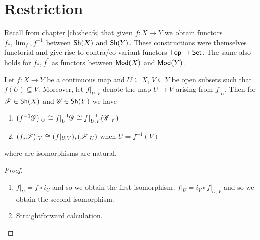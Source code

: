 \documentclass{memoir}
\begin{document}
\section{Restriction}
\begin{remark}
    Recall from chapter \ref{ch:sheafs} that given $f:X\to Y$ we obtain functors $f_*,\lim_f,f^{-1}$ between ${\normalfont\mathsf{Sh}}(X)$ and ${\normalfont\mathsf{Sh}}(Y)$.
    These constructions were themselves functorial and give rise to contra/co-variant functors ${\normalfont\mathsf{Top}}\to {\normalfont\mathsf{Set}}$.
    The same also holds for $f_*,f^*$ as functors between ${\normalfont\mathsf{Mod}}(X)$ and ${\normalfont\mathsf{Mod}}(Y)$.
\end{remark}
\begin{thm}
    Let $f:X\to Y$ be a continuous map and $U\subseteq X$, $V\subseteq Y$ be open subsets such that $f(U)\subseteq V$.
    Moreover, let $f|_{U,V}$ denote the map $U\to V$ arising from $f|_U$.
    Then for $\mathscr{F}\in {\normalfont\mathsf{Sh}}(X)$ and $\mathscr{G}\in {\normalfont\mathsf{Sh}}(Y)$ we have
    \begin{enumerate}
        \item $(f^{-1}\mathscr{G})|_U \cong f|_U^{-1}\mathscr{G} \cong f|_{U,V}^{-1}(\mathscr{G}|_V)$
        \item $(f_*\mathscr{F})|_V \cong (f|_{U,V})_*(\mathscr{F}|_U)$ when $U = f^{-1}(V)$
    \end{enumerate}
    where are isomorphisms are natural.
\end{thm}
\begin{proof}
    \begin{enumerate}
        \item $f|_U = f \circ i_U$ and so we obtain the first isomorphism.
            $f|_U = i_V \circ f|_{U,V}$ and so we obtain the second isomorphism.
        \item Straightforward calculation.
    \end{enumerate}
\end{proof}
\end{document}
